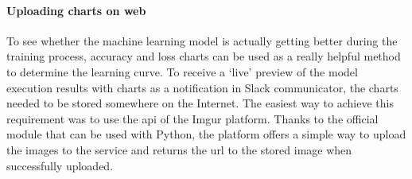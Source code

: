 \paragraph{Uploading charts on web}\label{para:charts-web-uploading}
To see whether the machine learning model is actually getting better during the training process, accuracy and loss charts can be used as a really helpful method to determine the learning curve.
To receive a `live' preview of the model execution results with charts as a notification in Slack communicator, the charts needed to be stored somewhere on the Internet.
The easiest way to achieve this requirement was to use the \gls{api} of the Imgur platform.
Thanks to the official module that can be used with Python, the platform offers a simple way to upload the images to the service and returns the \gls{url} to the stored image when successfully uploaded.
